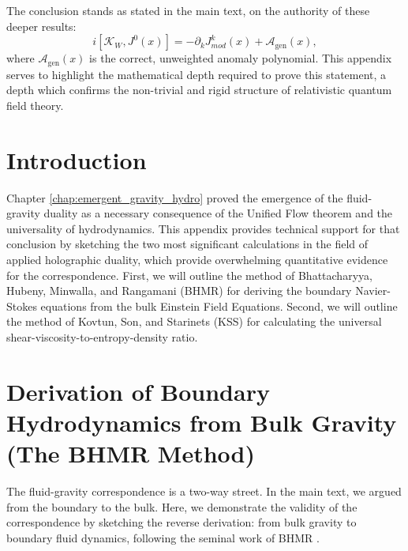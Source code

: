 \documentclass[11pt, letterpaper]{report}
\theoremstyle{plain} %
\theoremstyle{definition} %
\theoremstyle{remark} %
\newcommand{\ModularK}{\mathcal{K}}
\begin{document}
The conclusion stands as stated in the main text, on the authority of these deeper results:
\begin{equation}
    i[\ModularK_W, J^0(x)] = -\partial_k J^k_{mod}(x) + \mathcal{A}_{\text{gen}}(x),
\end{equation}
where $\mathcal{A}_{\text{gen}}(x)$ is the correct, unweighted anomaly polynomial. This appendix serves to highlight the mathematical depth required to prove this statement, a depth which confirms the non-trivial and rigid structure of relativistic quantum field theory.






\appendix
{}
\label{app:fluid_gravity_support}

\section{Introduction}

Chapter \ref{chap:emergent_gravity_hydro} proved the emergence of the fluid-gravity duality as a necessary consequence of the Unified Flow theorem and the universality of hydrodynamics. This appendix provides technical support for that conclusion by sketching the two most significant calculations in the field of applied holographic duality, which provide overwhelming quantitative evidence for the correspondence. First, we will outline the method of Bhattacharyya, Hubeny, Minwalla, and Rangamani (BHMR) for deriving the boundary Navier-Stokes equations from the bulk Einstein Field Equations. Second, we will outline the method of Kovtun, Son, and Starinets (KSS) for calculating the universal shear-viscosity-to-entropy-density ratio.

\section{Derivation of Boundary Hydrodynamics from Bulk Gravity (The BHMR Method)}
\label{app:bhmr_method}

The fluid-gravity correspondence is a two-way street. In the main text, we argued from the boundary to the bulk. Here, we demonstrate the validity of the correspondence by sketching the reverse derivation: from bulk gravity to boundary fluid dynamics, following the seminal work of BHMR \cite{Bhattacharyya2008NonlinearFluid}.
\end{document}
